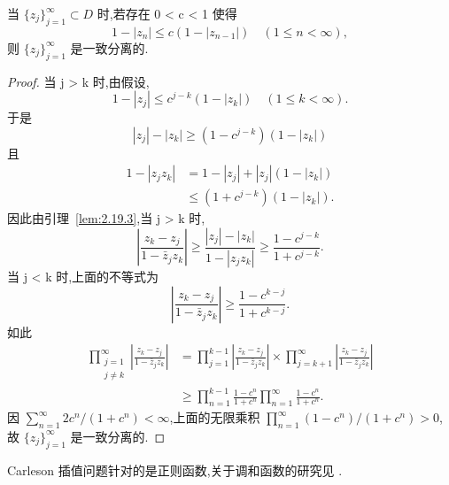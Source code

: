 \begin{example}\label{exa:2.19.4}
当 $\{z_{j}\}_{j=1}^{\infty} \subset D$ 时,若存在 0 < c < 1 使得
\begin{equation*}
1 - |z_{n}| \leq c(1 - |z_{n-1}|) \quad (1 \leq n < \infty),
\end{equation*}
则 $\{z_{j}\}_{j=1}^{\infty}$ 是一致分离的.
\end{example}

\begin{proof}
当 j > k 时,由假设,
\begin{equation*}
1 - |z_{j}| \leq c^{j-k}(1 - |z_{k}|) \quad (1 \leq k < \infty).
\end{equation*}
于是
\begin{equation*}
|z_{j}| - |z_{k}| \geq (1 - c^{j-k})(1 - |z_{k}|)
\end{equation*}
且
\begin{align*}
1 - |z_{j}z_{k}| & = 1 - |z_{j}| + |z_{j}|(1 - |z_{k}|) \\
& \leq (1 + c^{j-k})(1 - |z_{k}|).
\end{align*}
因此由引理~\ref{lem:2.19.3},当 j > k 时,
\begin{equation*}
\left| \frac{z_{k} - z_{j}}{1 - \bar{z}_{j}z_{k}} \right| \geq \frac{|z_{j}| - |z_{k}|}{1 - |z_{j}z_{k}|} \geq \frac{1 - c^{j-k}}{1 + c^{j-k}}.
\end{equation*}
当 j < k 时,上面的不等式为
\begin{equation*}
\left| \frac{z_{k} - z_{j}}{1 - \bar{z}_{j}z_{k}} \right| \geq \frac{1 - c^{k-j}}{1 + c^{k-j}}.
\end{equation*}
如此
\begin{align*}
\prod_{\substack{j=1\\ j\neq k}}^{\infty}\left| \frac{z_{k} - z_{j}}{1 - \bar{z}_{j}z_{k}} \right| &= \prod_{j=1}^{k-1}\left| \frac{z_{k} - z_{j}}{1 - \bar{z}_{j}z_{k}} \right| \times \prod_{j=k+1}^{\infty}\left| \frac{z_{k} - z_{j}}{1 - \bar{z}_{j}z_{k}} \right| \\
&\geq \prod_{n=1}^{k-1}\frac{1 - c^{n}}{1 + c^{n}}\prod_{n=1}^{\infty}\frac{1 - c^{n}}{1 + c^{n}}.
\end{align*}
因 $\sum_{n=1}^{\infty}2c^{n}/(1 + c^{n}) < \infty$,上面的无限乘积 $\prod_{n=1}^{\infty}(1 - c^{n})/(1 + c^{n}) > 0$,故 $\{z_{j}\}_{j=1}^{\infty}$ 是一致分离的.
\end{proof}

Carleson 插值问题针对的是正则函数,关于调和函数的研究见 \cite{ch2:21}.
